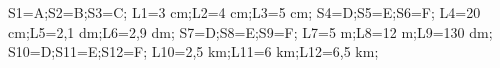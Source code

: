 \documentclass[exercice]{thedocument}%
\begin{document}
%
    \>S1=A;\>S2=B;\>S3=C;%
    \>L1=3 cm;\>L2=4 cm;\>L3=5 cm;%
    \>S4=D;\>S5=E;\>S6=F;%
    \>L4=20 cm;\>L5=2,1 dm;\>L6=2,9 dm;%
    \>S7=D;\>S8=E;\>S9=F;%
    \>L7=5 m;\>L8=12 m;\>L9=130 dm;%
    \>S10=D;\>S11=E;\>S12=F;%
    \>L10=2,5 km;\>L11=6 km;\>L12=6,5 km;%
\end{document}
